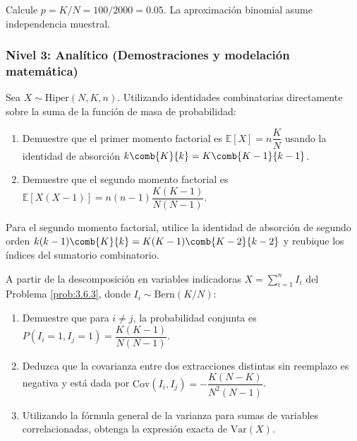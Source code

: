 \begin{sugerencia}
	Calcule $p = K/N = 100/2000 = 0.05$. La aproximación binomial asume independencia muestral.
\end{sugerencia}

\subsubsection*{Nivel 3: Analítico (Demostraciones y modelación matemática)}

\begin{problema}
	\label{prob:3.6.7}
	Sea $X \sim \text{Hiper}(N, K, n)$. Utilizando identidades combinatorias directamente sobre la suma de la función de masa de probabilidad:
	\begin{enumerate}
		\item Demuestre que el primer momento factorial es $\mathbb{E}[X] = n \dfrac{K}{N}$ usando la identidad de absorción $k \comb{K}{k} = K \comb{K-1}{k-1}$.
		\item Demuestre que el segundo momento factorial es $\mathbb{E}[X(X-1)] = n(n-1) \dfrac{K(K-1)}{N(N-1)}$.
	\end{enumerate}
\end{problema}

\begin{sugerencia}
	Para el segundo momento factorial, utilice la identidad de absorción de segundo orden $k(k-1)\comb{K}{k} = K(K-1)\comb{K-2}{k-2}$ y reubique los índices del sumatorio combinatorio.
\end{sugerencia}

\begin{problema}
	\label{prob:3.6.8}
	A partir de la descomposición en variables indicadoras $X = \sum_{i=1}^n I_i$ del Problema \ref{prob:3.6.3}, donde $I_i \sim \text{Bern}(K/N)$:
	\begin{enumerate}
		\item Demuestre que para $i \neq j$, la probabilidad conjunta es $P(I_i = 1, I_j = 1) = \dfrac{K(K-1)}{N(N-1)}$.
		\item Deduzca que la covarianza entre dos extracciones distintas sin reemplazo es negativa y está dada por $\text{Cov}(I_i, I_j) = -\dfrac{K(N-K)}{N^2(N-1)}$.
		\item Utilizando la fórmula general de la varianza para sumas de variables correlacionadas, obtenga la expresión exacta de $\text{Var}(X)$.
	\end{enumerate}
\end{problema}

